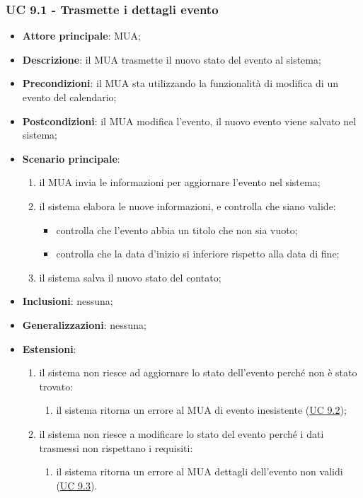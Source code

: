 \subsubsection{UC 9.1 - Trasmette i dettagli evento} \label{sec:UC9.1}
    \begin{itemize}
        \item \textbf{Attore principale}: MUA;
        \item \textbf{Descrizione}: il MUA trasmette il nuovo stato del evento al sistema;
        \item \textbf{Precondizioni}: il MUA sta utilizzando la funzionalità di modifica di un evento del calendario;
        \item \textbf{Postcondizioni}: il MUA modifica l'evento, il nuovo evento viene salvato nel sistema;
        \item \textbf{Scenario principale}:
            \begin{enumerate}
                \item il MUA invia le informazioni per aggiornare l'evento nel sistema;
                \item il sistema elabora le nuove informazioni, e controlla che siano valide:
                \begin{itemize}
                    \item controlla che l'evento abbia un titolo che non sia vuoto;
                    \item controlla che la data d'inizio si inferiore rispetto alla data di fine;
                \end{itemize}
                \item il sistema salva il nuovo stato del contato;
            \end{enumerate}
        \item \textbf{Inclusioni}: nessuna;
        \item \textbf{Generalizzazioni}: nessuna;
        \item \textbf{Estensioni}: 
            \begin{enumerate}[label=\alph*.]
                \item il sistema non riesce ad aggiornare lo stato dell'evento perché non è stato trovato:
                \begin{enumerate}[label=\arabic*.]
                    \item il sistema ritorna un errore al MUA di evento inesistente (\hyperref[sec:UC9.2]{UC 9.2});
                \end{enumerate}
                \item il sistema non riesce a modificare lo stato del evento perché i dati trasmessi non rispettano i requisiti:
                \begin{enumerate}[label=\arabic*.]
                    \item il sistema ritorna un errore al MUA dettagli dell'evento non validi (\hyperref[sec:UC9.3]{UC 9.3}).
                \end{enumerate}
            \end{enumerate}
    \end{itemize}

